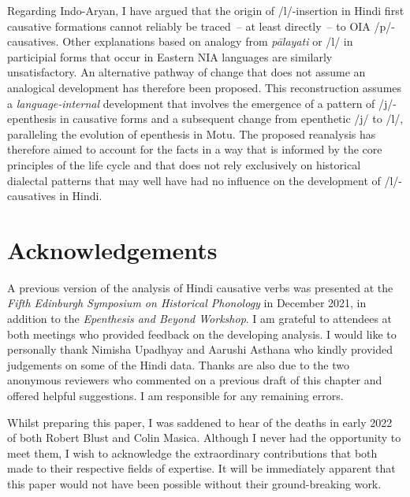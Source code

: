 \documentclass[output=paper,colorlinks,citecolor=brown]{langscibook}
\begin{document}
Regarding Indo-Aryan, I have argued that the origin of /l/-insertion in Hindi first causative formations cannot reliably be traced~-- at least directly~-- to OIA /p/-causatives.  Other explanations based on analogy from \textit{pālayati} or /l/ in participial forms that occur in Eastern NIA languages are similarly unsatisfactory.  An alternative pathway of change that does not assume an analogical development has therefore been proposed.  This reconstruction assumes a \textit{language-internal} development that involves the emergence of a pattern of /j/-epenthesis in causative forms and a subsequent change from epenthetic /j/ to /l/, paralleling the evolution of epenthesis in Motu. The proposed reanalysis has therefore aimed to account for the facts in a way that is informed by the core principles of the life cycle and that does not rely exclusively on historical dialectal patterns that may well have had no influence on the development of /l/-causatives in Hindi. 

\section*{Acknowledgements}
A previous version of the analysis of Hindi causative verbs was presented at the \textit{Fifth Edinburgh Symposium on Historical Phonology} in December 2021, in addition to the \textit{Epenthesis and Beyond Workshop}. I am grateful to attendees at both meetings who provided feedback on the developing analysis. I would like to personally thank Nimisha Upadhyay and Aarushi Asthana who kindly provided judgements on some of the Hindi data.  Thanks are also due to the two anonymous reviewers who commented on a previous draft of this chapter and offered helpful suggestions. I am responsible for any remaining errors.

Whilst preparing this paper, I was saddened to hear of the deaths in early 2022 of both Robert Blust and Colin Masica. Although I never had the opportunity to meet them, I wish to acknowledge the extraordinary contributions that both made to their respective fields of expertise. It will be immediately apparent that this paper would not have been possible without their ground-breaking work.

{\sloppy\printbibliography[heading=subbibliography,notkeyword=this]}
\renewcommand*{\rowletter}{\stepcounter{tableaurow}\alph{tableaurow}. }
\end{document}
